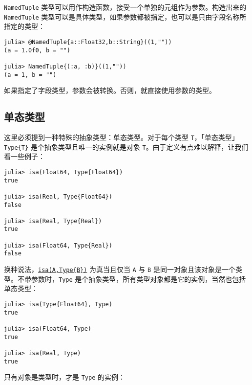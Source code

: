 \texttt{NamedTuple} 类型可以用作构造函数，接受一个单独的元组作为参数。构造出来的 \texttt{NamedTuple} 类型可以是具体类型，如果参数都被指定，也可以是只由字段名称所指定的类型：




\begin{verbatim}
julia> @NamedTuple{a::Float32,b::String}((1,""))
(a = 1.0f0, b = "")

julia> NamedTuple{(:a, :b)}((1,""))
(a = 1, b = "")
\end{verbatim}



如果指定了字段类型，参数会被转换。否则，就直接使用参数的类型。



\hypertarget{647919389478144252}{}


\subsection{单态类型}



这里必须提到一种特殊的抽象类型：单态类型。对于每个类型 \texttt{T}，「单态类型」\texttt{Type\{T\}} 是个抽象类型且唯一的实例就是对象 \texttt{T}。由于定义有点难以解释，让我们看一些例子：




\begin{verbatim}
julia> isa(Float64, Type{Float64})
true

julia> isa(Real, Type{Float64})
false

julia> isa(Real, Type{Real})
true

julia> isa(Float64, Type{Real})
false
\end{verbatim}



换种说法，\hyperlink{7066325108767373297}{\texttt{isa(A,Type\{B\})}} 为真当且仅当 \texttt{A} 与 \texttt{B} 是同一对象且该对象是一个类型。不带参数时，\texttt{Type} 是个抽象类型，所有类型对象都是它的实例，当然也包括单态类型：




\begin{verbatim}
julia> isa(Type{Float64}, Type)
true

julia> isa(Float64, Type)
true

julia> isa(Real, Type)
true
\end{verbatim}



只有对象是类型时，才是 \texttt{Type} 的实例：





